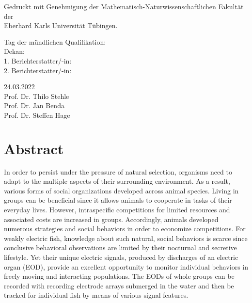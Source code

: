 \documentclass[11pt,pdftex,]{book}
\begin{document}
\thispagestyle{empty}
\vspace*{\fill}

\noindent
{\large Gedruckt mit Genehmigung der Mathematisch-Naturwissenschaftlichen Fakultät der\\
Eberhard Karls Universität Tübingen.\\}
\vspace{1cm}

\hspace{-0.7cm}
\noindent
\begin{minipage}{0.49\textwidth}
{\large Tag der mündlichen Qualifikation:\\
Dekan:\\
1. Berichterstatter/-in:\\
2. Berichterstatter/-in:\\}
\end{minipage}\hfill
\begin{minipage}{0.49\textwidth}
\noindent
{\large 24.03.2022\\
Prof. Dr. Thilo Stehle\\
Prof. Dr. Jan Benda\\
Prof. Dr. Steffen Hage\\}
\end{minipage}
\clearpage

\setcounter{tocdepth}{1}
\vspace{-2cm}
{
  \hypersetup{linkcolor=black}
  \tableofcontents
}
{}

\chapter*{Abstract}

In order to persist under the pressure of natural selection, organisms need to adapt to the multiple aspects of their surrounding environment. As a result, various forms of social organizations developed across animal species. Living in groups can be beneficial since it allows animals to cooperate in tasks of their everyday lives. However, intraspecific competitions for limited resources and associated costs are increased in groups. Accordingly, animals developed numerous strategies and social behaviors in order to economize competitions. For weakly electric fish, knowledge about such natural, social behaviors is scarce since conclusive behavioral observations are limited by their nocturnal and secretive lifestyle. Yet their unique electric signals, produced by discharges of an electric organ (EOD), provide an excellent opportunity to monitor individual behaviors in freely moving and interacting populations. The EODs of whole groups can be recorded with recording electrode arrays submerged in the water and then be tracked for individual fish by means of various signal features.
\end{document}
